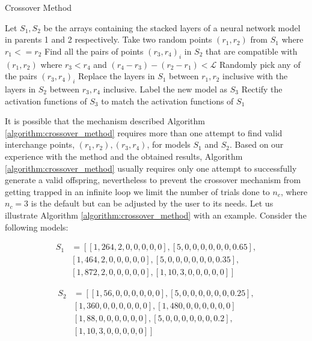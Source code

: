 \documentclass[journal]{IEEEtran}
\begin{document}
\begin{algorithm}[!htb]
\caption{Crossover Method}
\begin{algorithmic}
\State Let $S_1, S_2$ be the arrays containing the stacked layers of a neural network model in parents 1 and 2 respectively.
\State Take two random points $(r_1, r_2)$ from $S_1$ where $r_1 <= r_2 $
\Else 
\EndIf
\State Find all the pairs of points $(r_3, r_4)_i$ in $S_2$ that are compatible with $(r_1, r_2)$ where $r_3 < r_4$ and $(r_4 - r_3) - (r_2 - r_1) < \mathcal{L}$
\State Randomly pick any of the pairs $(r_3, r_4)_i$
\State Replace the layers in $S_1$ between $r_1, r_2$ inclusive with the layers in $S_2$ between $r_3, r_4$ inclusive. Label the new model as $S_3$
\State Rectify the activation functions of $S_3$ to match the activation functions of $S_1$
\end{algorithmic}
\label{algorithm:crossover_method}
\end{algorithm}

It is possible that the mechanism described Algorithm \ref{algorithm:crossover_method} requires more than one attempt to find valid interchange points, $(r_1, r_2), (r_3, r_4)$, for models $S_1$ and $S_2$. Based on our experience with the method and the obtained results,  Algorithm \ref{algorithm:crossover_method} usually requires only one attempt to successfully generate a valid offspring, nevertheless to prevent the crossover mechanism from getting trapped in an infinite loop we limit the number of trials done to $n_c$, where $n_c=3$ is the default but can be adjusted by the user to its needs. Let us illustrate Algorithm \ref{algorithm:crossover_method} with an example. Consider the following models:

\begin{align*}
S_1 & = \left[ \left[1, 264, 2, 0, 0, 0, 0, 0 \right], \left[5, 0, 0, 0, 0, 0, 0, 0.65 \right], \right. \\
& \left. \left[1, 464, 2, 0, 0, 0, 0, 0 \right], \left[5, 0, 0, 0, 0, 0, 0, 0.35 \right], \right. \\
& \left. \left[1, 872, 2, 0, 0, 0, 0, 0 \right], \left[1, 10, 3, 0, 0, 0, 0, 0 \right] \right]
\end{align*}

\begin{align*}
S_2 & = \left[ \left[1, 56, 0, 0, 0, 0, 0, 0 \right], \left[5, 0, 0, 0, 0, 0, 0, 0.25 \right], \right. \\
&  \left. \left[1, 360, 0, 0, 0, 0, 0, 0 \right], \left[1, 480, 0, 0, 0, 0, 0, 0 \right] \right. \\
&  \left. \left[1, 88, 0, 0, 0, 0, 0, 0 \right], \left[5, 0, 0, 0, 0, 0, 0, 0.2 \right], \right. \\
&  \left. \left[1, 10, 3, 0, 0, 0, 0, 0 \right] \right]
\end{align*}
\end{document}
